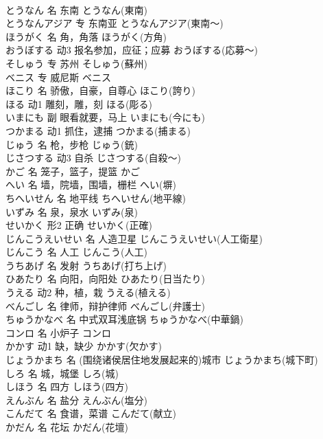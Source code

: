 \documentclass[8pt]{extreport}
\begin{document}
\begin{CJK}{UTF8}{min}
\\	とうなん	名	东南	とうなん(東南)	
\\	とうなんアジア	专	东南亚	とうなんアジア(東南～)	
\\	ほうがく	名	角，角落	ほうがく(方角)	
\\	おうぼする	动3	报名参加，应征；应募	おうぼする(応募～)	
\\	そしゅう	专	苏州	そしゅう(蘇州)	
\\	ベニス	专	威尼斯	ベニス	
\\	ほこり	名	骄傲，自豪，自尊心	ほこり(誇り)	
\\	ほる	动1	雕刻，雕，刻	ほる(彫る)	
\\	いまにも	副	眼看就要，马上	いまにも(今にも)	
\\	つかまる	动1	抓住，逮捕	つかまる(捕まる)	
\\	じゅう	名	枪，步枪	じゅう(銃)	
\\	じさつする	动3	自杀	じさつする(自殺～)	
\\	かご	名	笼子，篮子，提篮	かご	
\\	へい	名	墙，院墙，围墙，栅栏	へい(塀)	
\\	ちへいせん	名	地平线	ちへいせん(地平線)	
\\	いずみ	名	泉，泉水	いずみ(泉)	
\\	せいかく	形2	正确	せいかく(正確)	
\\	じんこうえいせい	名	人造卫星	じんこうえいせい(人工衛星)	
\\	じんこう	名	人工	じんこう(人工)	
\\	うちあげ	名	发射	うちあげ(打ち上げ)	
\\	ひあたり	名	向阳，向阳处	ひあたり(日当たり)	
\\	うえる	动2	种，植，栽	うえる(植える)	
\\	べんごし	名	律师，辩护律师	べんごし(弁護士)	
\\	ちゅうかなべ	名	中式双耳浅底锅	ちゅうかなべ(中華鍋)	
\\	コンロ	名	小炉子	コンロ	
\\	かかす	动1	缺，缺少	かかす(欠かす)	
\\	じょうかまち	名	(围绕诸侯居住地发展起来的)城市	じょうかまち(城下町)	
\\	しろ	名	城，城堡	しろ(城)	
\\	しほう	名	四方	しほう(四方)	
\\	えんぶん	名	盐分	えんぶん(塩分)	
\\	こんだて	名	食谱，菜谱	こんだて(献立)	
\\	かだん	名	花坛	かだん(花壇)	

\end{CJK}
\end{document}
